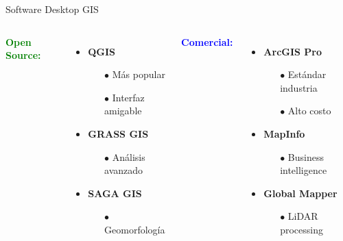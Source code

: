 \documentclass[10pt]{beamer}
\begin{document}
\begin{frame}{Software Desktop GIS}
    \begin{columns}
        \textbf{\textcolor{green}{Open Source:}}
        \begin{itemize}
            \item \textbf{QGIS}
                \begin{itemize}
                    \item[$\bullet$] Más popular
                    \item[$\bullet$] Interfaz amigable
                \end{itemize}
            \item \textbf{GRASS GIS}
                \begin{itemize}
                    \item[$\bullet$] Análisis avanzado
                \end{itemize}
            \item \textbf{SAGA GIS}
                \begin{itemize}
                    \item[$\bullet$] Geomorfología
                \end{itemize}
        \end{itemize}
        
        \textbf{\textcolor{blue}{Comercial:}}
        \begin{itemize}
            \item \textbf{ArcGIS Pro}
                \begin{itemize}
                    \item[$\bullet$] Estándar industria
                    \item[$\bullet$] Alto costo
                \end{itemize}
            \item \textbf{MapInfo}
                \begin{itemize}
                    \item[$\bullet$] Business intelligence
                \end{itemize}
            \item \textbf{Global Mapper}
                \begin{itemize}
                    \item[$\bullet$] LiDAR processing
                \end{itemize}
        \end{itemize}
    \end{columns}
\end{frame}
\end{document}
